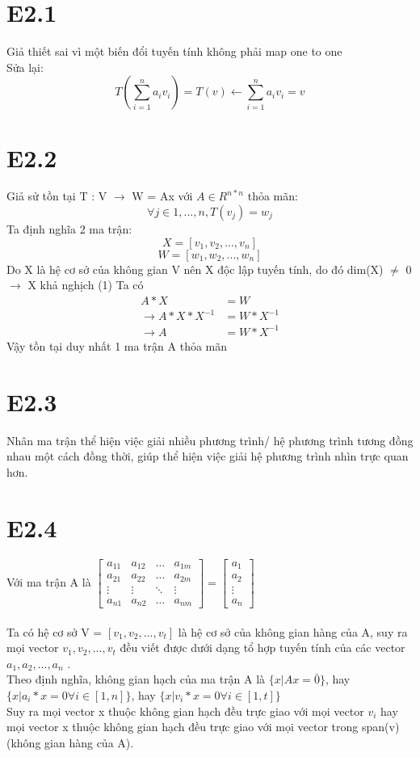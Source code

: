 \documentclass[a4paper,11pt]{article}
\theoremstyle{mytheor}
\begin{document}
\section*{E2.1}
Giả thiết sai vì một biến đổi tuyến tính không phải map one to one\\
Sửa lại:
$$T(\sum_{i=1}^n a_i v_i) = T(v) \xleftarrow{} \sum_{i=1}^n a_i v_i = v$$
\section*{E2.2}
Giả sử tồn tại T : V $\xrightarrow{}$ W = Ax với $A \in R^{n*n}$ thỏa mãn:
    $$\forall j \in 1,...,n,T(v_j) = w_j$$
Ta định nghĩa 2 ma trận:
$$
    X  =  [v_1,v_2,...,v_n]
$$
$$
    W  =  [w_1,w_2,...,w_n]
$$
Do X là hệ cơ sở của không gian V nên X độc lập tuyến tính, do đó dim(X) $\neq$ 0 $\xrightarrow{} $ X khả nghịch (1) 
Ta có
\begin{align}
    \nonumber A*X &= W\\
    \nonumber\xrightarrow{}A*X*X^{-1} &= W*X^{-1}\\
    \nonumber\xrightarrow{}A &= W*X^{-1}
\end{align}
Vậy tồn tại duy nhất 1 ma trận A thỏa mãn
\section*{E2.3}
Nhân ma trận thể hiện việc giải nhiều phương trình/ hệ phương trình tương đồng nhau một cách đồng thời, giúp thể hiện việc giải hệ phương trình nhìn trực quan hơn.
\section*{E2.4}
Với ma trận A là $\begin{bmatrix}
        a_{1 1} & a_{1 2} & \dots & a_{1 m}\\
        a_{2 1} & a_{2 2} & \dots & a_{2 m}\\
        \vdots & \vdots & \ddots & \vdots \\
        a_{n 1} & a_{n 2} & \dots & a_{n m}
        \end{bmatrix} 
        = \begin{bmatrix}
        a_1 \\ a_2 \\ \vdots \\ a_n
        \end{bmatrix}
        $ 
\\
\\
Ta có hệ cơ sở V = $[v_1,v_2,...,v_t]$ là hệ cơ sở của không gian hàng của A, suy ra mọi vector $v_1,v_2,...,v_t$ đều viết được dưới dạng tổ hợp tuyến tính của các vector$a_1,a_2,...,a_n$ .\\
Theo định nghĩa, không gian hạch của ma trận A là $\{x | Ax = \bar{0}\}$, hay $\{x|a_i*x = 0 \forall i \in [1,n]\}$, hay $\{x|v_i*x = 0 \forall i \in [1,t]\}$\\
Suy ra mọi vector x thuộc không gian hạch đều trực giao với mọi vector $v_i$ hay mọi vector x thuộc không gian hạch đều trực giao với mọi vector trong span(v) (không gian hàng của A).
\end{document}
